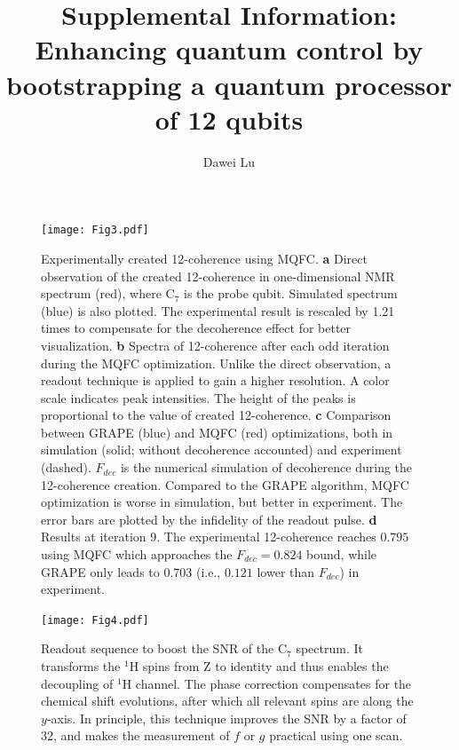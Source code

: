 \documentclass[twocolumn,reprint, amsmath,amssymb,showpacs,superscriptaddress]{revtex4-1}
\begin{document}
\newpage
\begin{figure}
\texttt{[image: Fig3.pdf]}
\caption{Experimentally created 12-coherence using MQFC. \textbf{a} Direct observation of the created 12-coherence in one-dimensional NMR spectrum (red), where C$_7$ is the probe qubit. Simulated spectrum (blue) is also plotted. The experimental result is rescaled by 1.21 times to compensate for the decoherence effect for better visualization. \textbf{b} Spectra of 12-coherence after each odd iteration during the MQFC optimization. Unlike the direct observation, a readout technique is applied to gain a higher resolution. A color scale indicates peak intensities. The height of the peaks is proportional to the value of created 12-coherence. \textbf{c} Comparison between GRAPE (blue) and MQFC (red) optimizations, both in simulation (solid; without decoherence accounted) and experiment (dashed). $F_{dec}$ is the numerical simulation of decoherence during the 12-coherence creation. Compared to the GRAPE algorithm, MQFC optimization is worse in simulation, but better in experiment. The error bars are plotted by the infidelity of the readout pulse. \textbf{d} Results at iteration 9. The experimental 12-coherence reaches $0.795$ using MQFC which approaches the $F_{dec} = 0.824$ bound, while GRAPE only leads to $0.703$ (i.e., $0.121$ lower than $F_{dec}$) in experiment. }
\label{fig3}
\end{figure}

\newpage
\begin{figure}[t]
\begin{center}
\texttt{[image: Fig4.pdf]}
\end{center}
\caption{Readout sequence to boost the SNR of the C$_7$ spectrum. It transforms the $^1$H spins from Z to identity and thus enables the decoupling of $^1$H channel. The phase correction compensates for the chemical shift evolutions, after which all relevant spins are along the $y$-axis.  In principle, this technique improves the SNR by a factor of 32, and makes the measurement of $f$ or $g$ practical using one scan.}\label{readout}
\end{figure}

\clearpage

\title{Supplemental Information: Enhancing quantum control by bootstrapping a quantum processor of 12 qubits}

\author{Dawei Lu}
\end{document}
